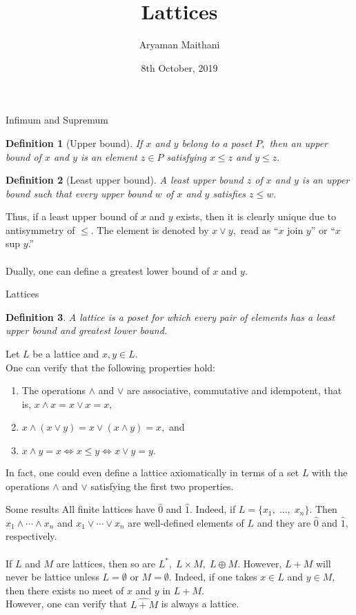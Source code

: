 \documentclass[handout, aspectratio=169]{beamer}
\title{Lattices}
\author{Aryaman Maithani}
\date[08-10-2019]{8th October, 2019}
\institute[IITB]{Undergraduate\\ IIT Bombay}
\newtheorem{defn}{Definition}
\begin{document}
\begin{frame}
	\titlepage
\end{frame}
\begin{frame}{Infimum and Supremum}
	\begin{defn}[Upper bound]
		If $x$ and $y$ belong to a poset $P,$ then \emph{an} upper bound of $x$ and $y$ is an element $z \in P$ satisfying $x \le z$ and $y \le z.$
	\end{defn}
	\begin{defn}[Least upper bound]
		A least upper bound $z$ of $x$ and $y$ is an upper bound such that every upper bound $w$ of $x$ and $y$ satisfies $z \le w.$
	\end{defn}
	Thus, if a least upper bound of $x$ and $y$ exists, then it is clearly unique due to antisymmetry of $\le.$ The element is denoted by $x \vee y,$ read as ``$x$ join $y$'' or ``$x$ sup $y$.''\\~\\
	Dually, one can define a greatest lower bound of $x$ and $y.$
\end{frame}
\begin{frame}{Lattices}
	\begin{defn}
		A lattice is a poset for which every pair of elements has a least upper bound and greatest lower bound.
	\end{defn}
	Let $L$ be a lattice and $x, y\in L.$\\
	One can verify that the following properties hold:
	\begin{enumerate} 
		\item The operations $\wedge$ and $\vee$ are associative, commutative and idempotent, that is, $x \wedge x = x \vee x = x,$
		\item $x \wedge (x \vee y) = x \vee (x \wedge y) = x,$ and
		\item $x \wedge y = x \iff x \le y \iff x \vee y = y.$
	\end{enumerate}
	In fact, one could even define a lattice axiomatically in terms of a set $L$ with the operations $\wedge$ and $\vee$ satisfying the first two properties. 
\end{frame}
\begin{frame}{Some results}
	All finite lattices have $\hat{0}$ and $\hat{1}.$ Indeed, if $L = \{x_1,\;\ldots,\;x_n\}.$ Then $x_1 \wedge \cdots \wedge x_n$ and $x_1 \vee \cdots \vee x_n$ are well-defined elements of $L$ and they are $\hat{0}$ and $\hat{1},$ respectively.\\~\\
	If $L$ and $M$ are lattices, then so are $L^*,\;L\times M,\;L\oplus M.$ However, $L + M$ will never be lattice unless $L = \emptyset$ or $M = \emptyset.$ Indeed, if one takes $x \in L$ and $y \in M,$ then there exists no meet of $x$ and $y$ in $L+M.$\\
	However, one can verify that $\widehat{L+M}$ is always a lattice.
\end{frame}
\end{document}
